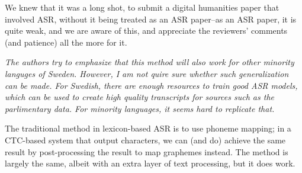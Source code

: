 \documentclass[11pt]{journalrebuttal}
\begin{document}
We knew that it was a long shot, to submit a digital humanities paper that involved ASR, without it being treated as an ASR paper--as an ASR paper, it is quite weak, and we are aware of this, and appreciate the reviewers' comments (and patience) all the more for it.

\textit{The authors try to emphasize that this method will also work for other minority languges of Sweden. However, I am not quire sure whether such generalization can be made. For Swedish, there are enough resources to train good ASR models, which can be used to create high quality transcripts for sources such as the parlimentary data. For minority languages, it seems hard to replicate that.}

The traditional method in lexicon-based ASR is to use phoneme mapping; in a CTC-based system that output characters, we can (and do) achieve the same result by post-processing the result to map graphemes instead. The method is largely the same, albeit with an extra layer of text processing, but it does work.



\end{document}
